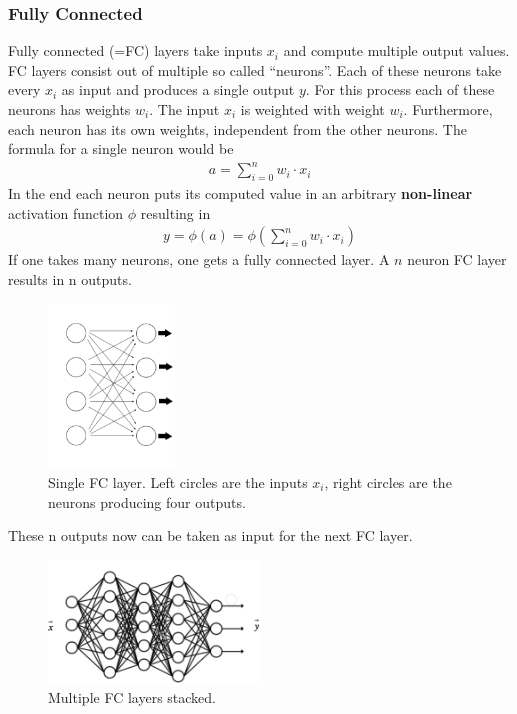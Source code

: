 \documentclass[
     11pt,         %
     a4paper,      %
     oneside,
     ]{article}
\begin{document}
\subsubsection{Fully Connected}
Fully connected (=FC) layers take inputs $x_i$ and compute multiple output values. FC layers consist out of multiple so called \enquote{neurons}. Each of these neurons take every $x_i$ as input and produces a single output $y$. For this process each of these neurons has weights $w_i$. The input $x_i$ is weighted with weight $w_i$. Furthermore, each neuron has its own weights, independent from the other neurons.
The formula for a single neuron would be
\begin{align*}
  a = \sum^n_{i=0} w_i \cdot x_i
\end{align*}
In the end each neuron puts its computed value in an arbitrary \textbf{non-linear} activation function $\phi$ resulting in
\begin{align*}
  y = \phi (a) = \phi ( \sum^n_{i=0} w_i \cdot x_i )
\end{align*}
If one takes many neurons, one gets a fully connected layer. A $n$ neuron FC layer results in n outputs.
\begin{figure}[H]
  \begin{center}
    \includegraphics[width=0.3\textwidth]{images/fc-layer.png}
    \caption{Single FC layer. Left circles are the inputs $x_i$, right circles are the neurons producing four outputs.}
    \label{fig:fc-layer}
  \end{center}
\end{figure}

These n outputs now can be taken as input for the next FC layer.
\begin{figure}[H]
  \begin{center}
    \includegraphics[width=0.5\textwidth]{images/multipleFC.png}
    \caption{Multiple FC layers stacked.}
    \label{fig:multipleFC}
  \end{center}
\end{figure}
\end{document}
